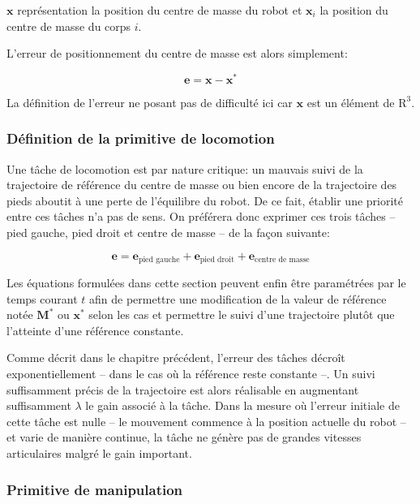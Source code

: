 $\mathbf{x}$ représentation la position du centre de masse du robot et
$\mathbf{x}_i$ la position du centre de masse du corps $i$.

L'erreur de positionnement du centre de masse est alors simplement:

\begin{equation}
  \mathbf{e} = \mathbf{x} - \mathbf{x}^{*}
\end{equation}

La définition de l'erreur ne posant pas de difficulté ici car
$\mathbf{x}$ est un élément de $\mathrm{R}^3$.


\subsubsection{Définition de la primitive de locomotion}

Une tâche de locomotion est par nature critique: un mauvais suivi de
la trajectoire de référence du centre de masse ou bien encore de la
trajectoire des pieds aboutit à une perte de l'équilibre du robot. De
ce fait, établir une priorité entre ces tâches n'a pas de sens. On
préférera donc exprimer ces trois tâches -- pied gauche, pied droit et
centre de masse -- de la façon suivante:

\begin{equation}
  \mathbf{e} = \mathbf{e}_{\text{pied gauche}} + \mathbf{e}_{\text{pied droit}} + \mathbf{e}_{\text{centre de masse}}
\end{equation}

Les équations formulées dans cette section peuvent enfin être
paramétrées par le temps courant $t$ afin de permettre une
modification de la valeur de référence notée $\mathbf{M}^*$ ou
$\mathbf{x}^*$ selon les cas et permettre le suivi d'une trajectoire
plutôt que l'atteinte d'une référence constante.


Comme décrit dans le chapitre précédent, l'erreur des tâches décroît
exponentiellement -- dans le cas où la référence reste constante
--. Un suivi suffisamment précis de la trajectoire est alors
réalisable en augmentant suffisamment $\lambda$ le gain associé à la
tâche. Dans la mesure où l'erreur initiale de cette tâche est nulle --
le mouvement commence à la position actuelle du robot -- et varie de
manière continue, la tâche ne génère pas de grandes vitesses
articulaires malgré le gain important.


\subsubsection{Primitive de manipulation}


